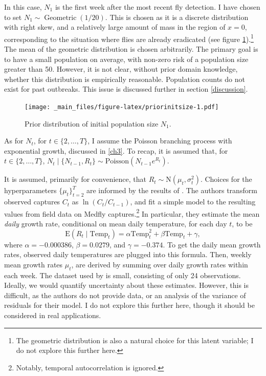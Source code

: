 \documentclass[
  oneside]{book}
\begin{document}
In this case, \(N_1\) is the first week after the most recent fly detection. I have chosen to set \(N_1 \sim \operatorname{Geometric}(1/20)\). This is chosen as it is a discrete distribution with right skew, and a relatively large amount of mass in the region of \(x = 0\), corresponding to the situation where flies are already eradicated (see figure \ref{fig:priorinitsize}).\footnote{The geometric distribution is also a natural choice for this latent variable; I do not explore this further here.} The mean of the geometric distribution is chosen arbitrarily. The primary goal is to have a small population on average, with non-zero risk of a population size greater than 50. However, it is not clear, without prior domain knowledge, whether this distribution is empirically reasonable. Population counts do not exist for past outbreaks. This issue is discussed further in section \ref{discussion}.

\begin{figure}
\centering
\texttt{[image: \_main\_files/figure-latex/priorinitsize-1.pdf]}
\caption{\label{fig:priorinitsize}Prior distribution of initial population size \(N_1\).}
\end{figure}

As for \(N_t\), for \(t \in \{2, \ldots, T\}\), I assume the Poisson branching process with exponential growth, discussed in \ref{ch3}. To recap, it is assumed that, for \(t \in \{2, \ldots, T\}\), \(N_t \mid \{ N_{t-1}, R_t \} \sim \mathrm{Poisson}(N_{t-1} e^{R_t})\).

It is assumed, primarily for convenience, that \(R_t \sim \mathrm N(\mu_t, \sigma^2_t)\). Choices for the hyperparameters \(\{\mu_t\}_{t=2}^T\) are informed by the results of \citet{ks2019}. The authors transform observed captures \(C_t\) as \(\ln (C_t / C_{t-1})\), and fit a simple model to the resulting values from field data on Medfly captures.\footnote{Notably, temporal autocorrelation is ignored.} In particular, they estimate the mean \emph{daily} growth rate, conditional on mean daily temperature, for each day \(t\), to be
\[
\mathrm E(R_t \mid \mathrm{Temp}_t) = \alpha \mathrm{Temp}_t^2 + \beta \mathrm{Temp}_t + \gamma,
\]
where \(\alpha = -0.000386\), \(\beta = 0.0279\), and \(\gamma = -0.374\). To get the daily mean growth rates, observed daily temperatures are plugged into this formula. Then, weekly mean growth rates \(\mu_t\), are derived by summing over daily growth rates within each week. The dataset used by \citet{ks2019} is small, consisting of only 24 observations. Ideally, we would quantify uncertainty about these estimates. However, this is difficult, as the authors do not provide data, or an analysis of the variance of residuals for their model. I do not explore this further here, though it should be considered in real applications.
\end{document}
